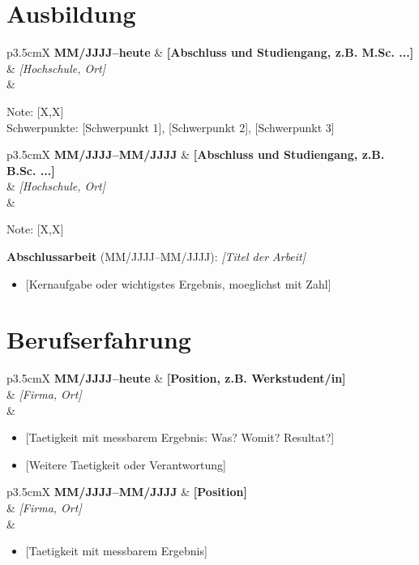 \documentclass[11pt,a4paper]{article}
\newcommand{\cventry}[4]
{
\vspace{0.8em}

\begin{tabularx}{\textwidth}{p{3.5cm}X}
\textbf{#1}
&
\textbf{#2}
\\[0.2em]
&
\textit{#3}
\\[0.5em]
&
\begin{minipage}[t]{0.95\linewidth}
#4
\end{minipage}
\end{tabularx}

\vspace{0.1em}
}
\begin{document}




\section{Ausbildung}

\cventry
{MM/JJJJ--heute}
{[Abschluss und Studiengang, z.B. M.Sc. ...]}
{[Hochschule, Ort]}
{Note: [X{,}X] %
\\[0.2em]
Schwerpunkte: [Schwerpunkt 1], [Schwerpunkt 2], [Schwerpunkt 3]}

\cventry
{MM/JJJJ--MM/JJJJ}
{[Abschluss und Studiengang, z.B. B.Sc. ...]}
{[Hochschule, Ort]}
{
Note: [X{,}X]

\vspace{0.4em}
\textbf{Abschlussarbeit} (MM/JJJJ--MM/JJJJ): \textit{[Titel der Arbeit]}
\begin{itemize}
\item {[Kernaufgabe oder wichtigstes Ergebnis, moeglichst mit Zahl]}
\end{itemize}
}


\section{Berufserfahrung}

\cventry
{MM/JJJJ--heute}
{[Position, z.B. Werkstudent/in]}
{[Firma, Ort]}
{
\begin{itemize}
\item {[Taetigkeit mit messbarem Ergebnis: Was? Womit? Resultat?]}
\item {[Weitere Taetigkeit oder Verantwortung]}
\end{itemize}
}

\cventry
{MM/JJJJ--MM/JJJJ}
{[Position]}
{[Firma, Ort]}
{
\begin{itemize}
\item {[Taetigkeit mit messbarem Ergebnis]}
\end{itemize}
}
\end{document}
